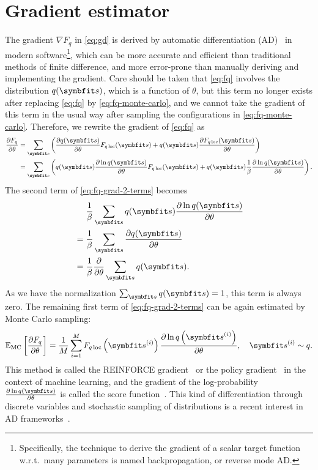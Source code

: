 \section{Gradient estimator}

The gradient $\nabla F_q$ in \cref{eq:gd} is derived by automatic differentiation (AD)~\cite{baydin2018automatic} in modern software\footnote{Specifically, the technique to derive the gradient of a scalar target function w.r.t.\ many parameters is named backpropagation, or reverse mode AD.}, which can be more accurate and efficient than traditional methods of finite difference, and more error-prone than manually deriving and implementing the gradient. Care should be taken that \cref{eq:fq} involves the distribution $q(\vs)$, which is a function of $\theta$, but this term no longer exists after replacing \cref{eq:fq} by \cref{eq:fq-monte-carlo}, and we cannot take the gradient of this term in the usual way after sampling the configurations in \cref{eq:fq-monte-carlo}. Therefore, we rewrite the gradient of \cref{eq:fq} as
\begin{align}
\frac{\partial F_q}{\partial \theta}
&= \sum_\vs \left( \frac{\partial q(\vs)}{\partial \theta} F_{q\,\text{loc}}(\vs) + q(\vs) \frac{\partial F_{q\,\text{loc}}(\vs)}{\partial \theta} \right) \\
&= \sum_\vs \left( q(\vs) \frac{\partial \ln q(\vs)}{\partial \theta} F_{q\,\text{loc}}(\vs) + q(\vs) \frac{1}{\beta} \frac{\partial \ln q(\vs)}{\partial \theta} \right).
\label{eq:fq-grad-2-terms}
\end{align}
The second term of \cref{eq:fq-grad-2-terms} becomes
\begin{align}
&\phantom{{}={}}\frac{1}{\beta} \sum_\vs q(\vs) \frac{\partial \ln q(\vs)}{\partial \theta} \\
&= \frac{1}{\beta} \sum_\vs \frac{\partial q(\vs)}{\partial \theta} \\
&= \frac{1}{\beta} \frac{\partial}{\partial \theta} \sum_\vs q(\vs).
\end{align}
As we have the normalization $\sum_\vs q(\vs) = 1$, this term is always zero. The remaining first term of \cref{eq:fq-grad-2-terms} can be again estimated by Monte Carlo sampling:
\begin{equation}
\bbE_\text{MC}\left[ \frac{\partial F_q}{\partial \theta} \right]
= \frac{1}{M} \sum_{i = 1}^M F_{q\,\text{loc}}\left( \vs^{(i)} \right) \frac{\partial \ln q\left( \vs^{(i)} \right)}{\partial \theta}, \quad
\vs^{(i)} \sim q.
\label{eq:fq-grad}
\end{equation}
This method is called the REINFORCE gradient~\cite{williams1992simple} or the policy gradient~\cite{sutton1999policy} in the context of machine learning, and the gradient of the log-probability $\frac{\partial \ln q(\vs)}{\partial \theta}$ is called the score function~\cite{fisher1935detection, hyvarinen2005estimation, mohamed2020monte}. This kind of differentiation through discrete variables and stochastic sampling of distributions is a recent interest in AD frameworks~\cite{krieken2021storchastic, arya2022automatic, catumba2023stochastic}.

